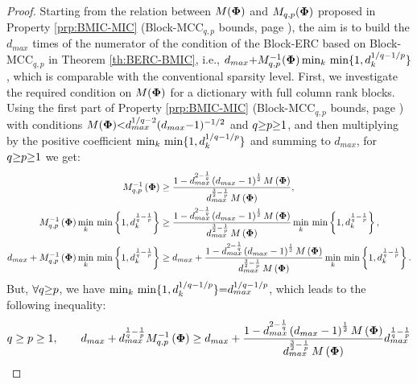 \begin{proof}
Starting from the relation between $M(\boldsymbol{\Phi})$ and $M_{q,p}(\boldsymbol{\Phi})$ proposed in Property \ref{prp:BMIC-MIC} (Block-MCC$_{q,p}$ bounds, page \pageref{prp:BMIC-MIC}), the aim is to build the $d_{max}$ times of the numerator of the condition of the Block-ERC based on Block-MCC$_{q,p}$ in Theorem \ref{th:BERC-BMIC}, i.e., $d_{max} {+} M_{q,p}^{-1}(\boldsymbol{\Phi}) \min_{k} \, \min \{1 , d_k^{1/q {-} 1/p} \}$, which is comparable with the conventional sparsity level.
First, we investigate the required condition on $M(\boldsymbol{\Phi})$ for a dictionary with full column rank blocks.
Using the first part of Property \ref{prp:BMIC-MIC} (Block-MCC$_{q,p}$ bounds, page \pageref{prp:BMIC-MIC}) with conditions $M(\boldsymbol{\Phi}) {<} d_{max}^{1/q {-} 2} (d_{max} {-} 1)^{-1/2}$ and $q {\geq} p {\geq} 1$, and then multiplying by the positive coefficient $\min_{k} \, \min \{1 , d_k^{1/q {-} 1/p} \}$ and summing to $d_{max}$, for $q {\geq} p {\geq} 1$ we get:
\begin{gather*}
\begin{aligned}
M_{q,p}^{-1}\left( \boldsymbol{\Phi} \right) &\geq 
\frac{1- d_{max}^{2 - \frac1q} \left( d_{max} - 1 \right)^\frac12 M \left( \boldsymbol{\Phi} \right)}{d_{max}^{\frac32 - \frac1p} \, M\left( \boldsymbol{\Phi} \right)}, \\
M_{q,p}^{-1}\left( \boldsymbol{\Phi} \right) \displaystyle\min_{k} \, \min \left\lbrace 1 , d_k^{\frac1q - \frac1p} \right\rbrace &\geq 
\frac{1- d_{max}^{2 - \frac1q} \left( d_{max} - 1 \right)^\frac12 M \left( \boldsymbol{\Phi} \right)}{d_{max}^{\frac32 - \frac1p} \, M\left( \boldsymbol{\Phi} \right)} \displaystyle\min_{k} \, \min \left\lbrace 1 , d_k^{\frac1q - \frac1p} \right\rbrace, \\
d_{max} + M_{q,p}^{-1}\left( \boldsymbol{\Phi} \right) \displaystyle\min_{k} \, \min \left\lbrace 1 , d_k^{\frac1q - \frac1p} \right\rbrace &\geq 
d_{max} + \frac{1- d_{max}^{2 - \frac1q} \left( d_{max} - 1 \right)^\frac12 M \left( \boldsymbol{\Phi} \right)}{d_{max}^{\frac32 - \frac1p} \, M\left( \boldsymbol{\Phi} \right)} \displaystyle\min_{k} \, \min \left\lbrace 1 , d_k^{\frac1q - \frac1p} \right\rbrace.
\end{aligned}
\end{gather*}
But, $\forall q {\geq} p$, we have $\min_{k} \, \min \{1 , d_k^{1/q {-} 1/p} \} {=} d_{max}^{1/q {-} 1/p}$, which leads to the following inequality:
\begin{gather*}
\begin{aligned}
q \geq p \geq 1, \qquad
d_{max} + d_{max}^{\frac1q - \frac1p} M_{q,p}^{-1}\myparanthese{\myPhi} &\geq 
d_{max} + \frac{1- d_{max}^{2 - \frac1q} \myparanthese{d_{max} - 1}^\frac12 M \myparanthese{\myPhi}}{d_{max}^{\frac32 - \frac1p} \, M\myparanthese{\myPhi} } d_{max}^{\frac1q - \frac1p} \\

\end{aligned}
\end{gather*}
\end{proof}
